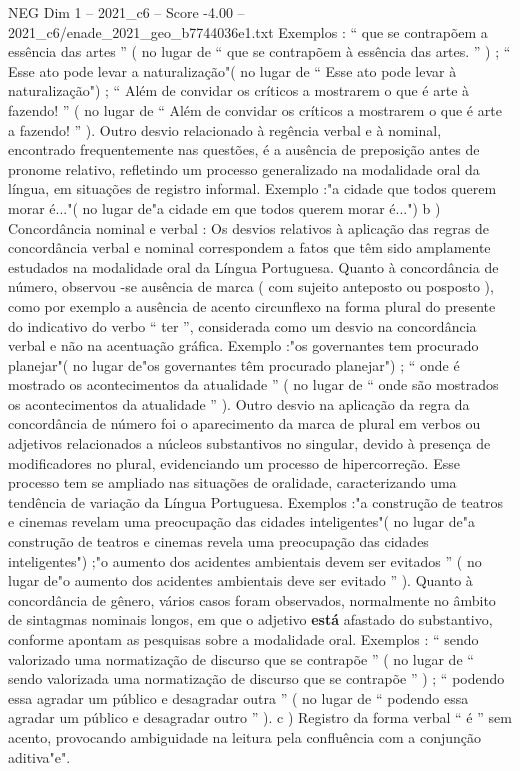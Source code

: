 \begin{textsample}{NEG Dim 1 – 2021\_c6 – Score -4.00 – 2021\_c6/enade\_2021\_geo\_b7744036e1.txt}
Exemplos : “ que se contrapõem a essência das artes ” ( no lugar de “ que se contrapõem à essência das artes. ” ) ; “ Esse ato pode levar a naturalização"( no lugar de “ Esse ato pode levar à naturalização") ; “ Além de convidar os críticos a mostrarem o que é arte à fazendo! ” ( no lugar de “ Além de convidar os críticos a mostrarem o que é arte a fazendo! ” ).
Outro desvio relacionado à regência verbal e à nominal, encontrado frequentemente nas questões, é a ausência de preposição antes de pronome relativo, refletindo um processo generalizado na modalidade oral da língua, em situações de registro informal.
Exemplo :"a cidade que todos querem morar é..."( no lugar de"a cidade em que todos querem morar é...") b ) Concordância nominal e verbal : Os desvios relativos à aplicação das regras de concordância verbal e nominal correspondem a fatos que têm sido amplamente estudados na modalidade oral da Língua Portuguesa.
Quanto à concordância de número, observou -se ausência de marca ( com sujeito anteposto ou posposto ), como por exemplo a ausência de acento circunflexo na forma plural do presente do indicativo do verbo “ ter ”, considerada como um desvio na concordância verbal e não na acentuação gráfica.
Exemplo :"os governantes tem procurado planejar"( no lugar de"os governantes têm procurado planejar") ; “ onde é mostrado os acontecimentos da atualidade ” ( no lugar de “ onde são mostrados os acontecimentos da atualidade ” ).
Outro desvio na aplicação da regra da concordância de número foi o aparecimento da marca de plural em verbos ou adjetivos relacionados a núcleos substantivos no singular, devido à presença de modificadores no plural, evidenciando um processo de hipercorreção.
Esse processo tem se ampliado nas situações de oralidade, caracterizando uma tendência de variação da Língua Portuguesa.
Exemplos :"a construção de teatros e cinemas revelam uma preocupação das cidades inteligentes"( no lugar de"a construção de teatros e cinemas revela uma preocupação das cidades inteligentes") ;"o aumento dos acidentes ambientais devem ser evitados ” ( no lugar de"o aumento dos acidentes ambientais deve ser evitado ” ).
Quanto à concordância de gênero, vários casos foram observados, normalmente no âmbito de sintagmas nominais longos, em que o adjetivo \textbf{está} afastado do substantivo, conforme apontam as pesquisas sobre a modalidade oral.
Exemplos : “ sendo valorizado uma normatização de discurso que se contrapõe ” ( no lugar de “ sendo valorizada uma normatização de discurso que se contrapõe ” ) ; “ podendo essa agradar um público e desagradar outra ” ( no lugar de “ podendo essa agradar um público e desagradar outro ” ). c ) Registro da forma verbal “ é ” sem acento, provocando ambiguidade na leitura pela confluência com a conjunção aditiva"e".

\end{textsample}

